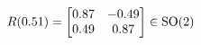 \documentclass[preview]{standalone}
\begin{document}
\begin{align*}
\special{dvisvgm:raw <g id='unique000'>}R(0.51) = \begin{bmatrix} 0.87 & -0.49 \\ 0.49 & 0.87 \end{bmatrix} \in \text{SO}(2)\special{dvisvgm:raw </g>}
\end{align*}
\end{document}
